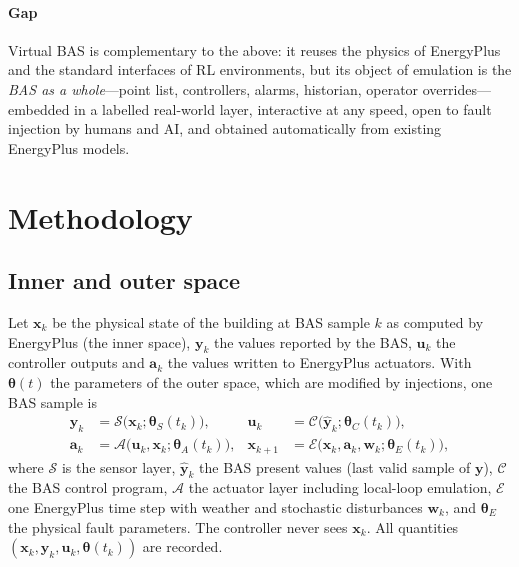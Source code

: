 \documentclass[preprint,12pt,authoryear=false]{elsarticle}
\begin{document}
\paragraph{Gap} Virtual BAS is complementary to the above: it reuses the physics of EnergyPlus and the standard
interfaces of RL environments, but its object of emulation is the \emph{BAS as a whole}---point list, controllers,
alarms, historian, operator overrides---embedded in a labelled real-world layer, interactive at any speed, open to fault
injection by humans and AI, and obtained automatically from existing EnergyPlus models.

\section{Methodology}
\label{sec:method}

\subsection{Inner and outer space}

Let $\mathbf{x}_k$ be the physical state of the building at BAS sample $k$ as computed by EnergyPlus (the inner
space), $\mathbf{y}_k$ the values reported by the BAS, $\mathbf{u}_k$ the controller outputs and $\mathbf{a}_k$ the
values written to EnergyPlus actuators. With $\boldsymbol{\theta}(t)$ the parameters of the outer space, which are
modified by injections, one BAS sample is
\begin{align}
\mathbf{y}_k &= \mathcal{S}\big(\mathbf{x}_k;\boldsymbol{\theta}_S(t_k)\big), &
\mathbf{u}_k &= \mathcal{C}\big(\hat{\mathbf{y}}_{k};\boldsymbol{\theta}_C(t_k)\big), \label{eq:loop1}\\
\mathbf{a}_k &= \mathcal{A}\big(\mathbf{u}_k, \mathbf{x}_k;\boldsymbol{\theta}_A(t_k)\big), &
\mathbf{x}_{k+1} &= \mathcal{E}\big(\mathbf{x}_k,\mathbf{a}_k, \mathbf{w}_k;\boldsymbol{\theta}_E(t_k)\big), \label{eq:loop2}
\end{align}
where $\mathcal{S}$ is the sensor layer, $\hat{\mathbf{y}}_k$ the BAS present values (last valid sample of
$\mathbf{y}$), $\mathcal{C}$ the BAS control program, $\mathcal{A}$ the actuator layer including local-loop
emulation, $\mathcal{E}$ one EnergyPlus time step with weather and stochastic disturbances $\mathbf{w}_k$, and
$\boldsymbol{\theta}_E$ the physical fault parameters. The controller never sees $\mathbf{x}_k$. All quantities
$(\mathbf{x}_k,\mathbf{y}_k,\mathbf{u}_k,\boldsymbol{\theta}(t_k))$ are recorded.
\end{document}
